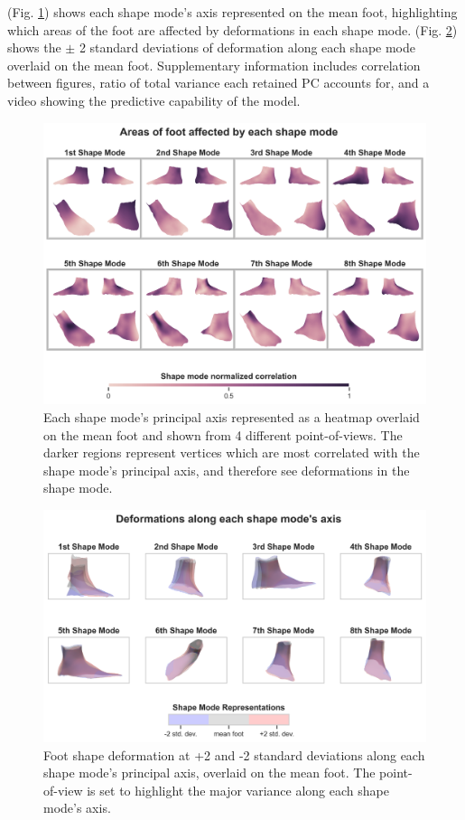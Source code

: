 \documentclass[defaultstyle,11pt]{comps}
\begin{document}
(Fig. \ref{fig:pca_quad}) shows each shape mode's axis represented on the mean foot, highlighting which areas of the foot are affected by deformations in each shape mode.
(Fig. \ref{fig:pca_overlay}) shows the \(\pm\) 2 standard deviations of deformation along each shape mode overlaid on the mean foot.
Supplementary information includes correlation between figures, ratio of total variance each retained PC accounts for, and a video showing the predictive capability of the model.

\begin{figure}
\hypertarget{fig:pca_quad}{%
\centering
\includegraphics{../fig/SA2/PCQuad.png}
\caption{Each shape mode's principal axis represented as a heatmap overlaid on the mean foot and shown from 4 different point-of-views. The darker regions represent vertices which are most correlated with the shape mode's principal axis, and therefore see deformations in the shape mode.}\label{fig:pca_quad}
}
\end{figure}

\begin{figure}
\hypertarget{fig:pca_overlay}{%
\centering
\includegraphics{../fig/SA2/PCVAR.png}
\caption{Foot shape deformation at +2 and -2 standard deviations along each shape mode's principal axis, overlaid on the mean foot. The point-of-view is set to highlight the major variance along each shape mode's axis.}\label{fig:pca_overlay}
}
\end{figure}
\end{document}
